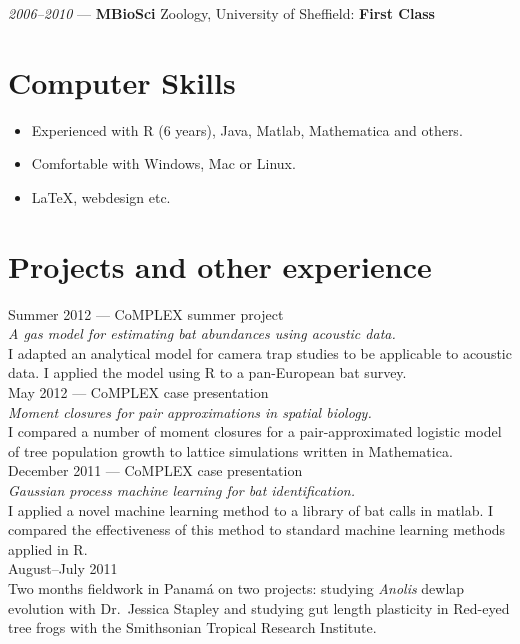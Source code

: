 \documentclass[a4paper,10pt,reqno,oneside]{amsart}
\begin{document}
\emph{2006--2010} --- \textbf{MBioSci} Zoology, University of Sheffield: \textbf{First Class}\\

\section*{Computer Skills}
\begin{itemize}
\item Experienced with R (6 years), Java, Matlab, Mathematica and others.
\item Comfortable with Windows, Mac or Linux.
\item LaTeX, webdesign etc.
\end{itemize}

\section*{Projects and other experience}

Summer 2012 --- \small{CoMPLEX} summer project\\
\emph{A gas model for estimating bat abundances using acoustic data.}\\
I adapted an analytical model for camera trap studies to be applicable to acoustic data. I applied the model using R to a pan-European bat survey. \\

May 2012 --- \small{CoMPLEX} case presentation\\
\emph{Moment closures for pair approximations in spatial biology.}\\
I compared a number of moment closures for a pair-approximated logistic model of tree population growth to lattice simulations written in Mathematica. \\

December 2011 --- \small{CoMPLEX} case presentation\\
\emph{Gaussian process machine learning for bat identification.}\\
I applied a novel machine learning method to a library of bat calls in matlab. I compared the effectiveness of this method to standard machine learning methods applied in R. \\

August--July 2011\\
Two months fieldwork in Panam\'{a} on two projects: studying \emph{Anolis} dewlap evolution with Dr.\ Jessica Stapley and studying gut length plasticity in Red-eyed tree frogs with the Smithsonian Tropical Research Institute. \\
\end{document}
